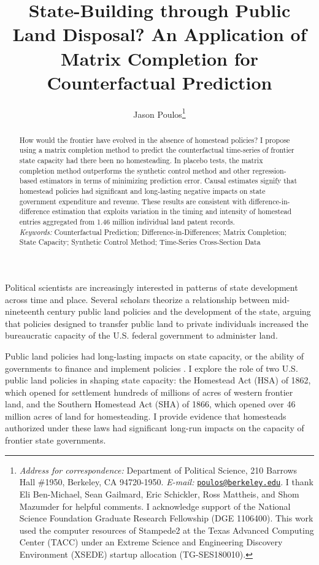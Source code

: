 \documentclass[hidelinks,12pt]{article}
\title{State-Building through Public Land Disposal? An Application of Matrix Completion for Counterfactual Prediction}
\author[ ]{Jason Poulos\thanks{\emph{Address for correspondence:} Department of Political Science, 210 Barrows Hall \#1950, Berkeley, CA 94720-1950. \emph{E-mail:} \href{mailto:poulos@berkeley.edu}{\nolinkurl{poulos@berkeley.edu}}. I thank Eli Ben-Michael, Sean Gailmard, Eric Schickler, Ross Mattheis, and Shom Mazumder for helpful comments. I acknowledge support of the National Science Foundation Graduate Research Fellowship (DGE 1106400). This work used the computer resources of Stampede2 at the Texas Advanced Computing Center (TACC) under an Extreme Science and Engineering Discovery Environment (XSEDE) startup allocation (TG-SES180010).}}
\affil[ ]{University of California, Berkeley}
\date{}
\begin{document}
 
 
\begin{singlespacing}
\maketitle  
\end{singlespacing}

\thispagestyle{empty}

\begin{abstract}  %
	\noindent
How would the frontier have evolved in the absence of homestead policies? I propose using a matrix completion method to predict the counterfactual time-series of frontier state capacity had there been no homesteading. In placebo tests, the matrix completion method outperforms the synthetic control method and other regression-based estimators in terms of minimizing prediction error. Causal estimates signify that homestead policies had significant and long-lasting negative impacts on state government expenditure and revenue. These results are consistent with difference-in-difference estimation that exploits variation in the timing and intensity of homestead entries aggregated from 1.46 million individual land patent records.
\vspace{10mm}\\
\emph{Keywords:} Counterfactual Prediction; Difference-in-Differences; Matrix Completion; State Capacity; Synthetic Control Method; Time-Series Cross-Section Data
\end{abstract}	

\pagebreak
{}%

Political scientists are increasingly interested in patterns of state development across time and place. Several scholars \citep[e.g.,][]{bensel1990,murtazashvili2013political,frymer2014rush} theorize a relationship between mid-nineteenth century public land policies and the development of the state, arguing that policies designed to transfer public land to private individuals increased the bureaucratic capacity of the U.S. federal government to administer land. 

Public land policies had long-lasting impacts on state capacity, or the ability of governments to finance and implement policies \citep{besley2010state}. I explore the role of two U.S. public land policies in shaping state capacity: the Homestead Act (HSA) of 1862, which opened for settlement hundreds of millions of acres of western frontier land, and the Southern Homestead Act (SHA) of 1866, which opened over 46 million acres of land for homesteading. I provide evidence that homesteads authorized under these laws had significant long-run impacts on the capacity of frontier state governments. 
\end{document}
